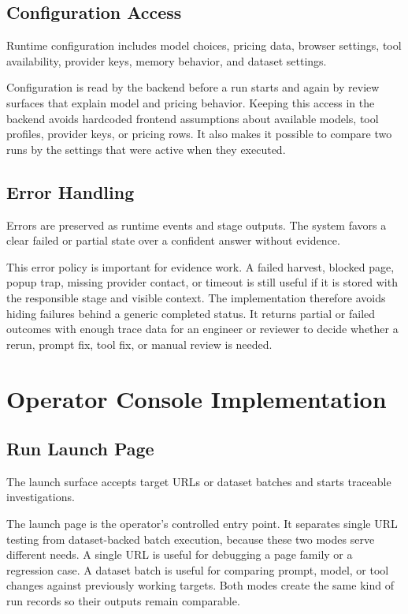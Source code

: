 \subsection{Configuration Access}

Runtime configuration includes model choices, pricing data, browser settings,
tool availability, provider keys, memory behavior, and dataset settings.

Configuration is read by the backend before a run starts and again by review
surfaces that explain model and pricing behavior. Keeping this access in the
backend avoids hardcoded frontend assumptions about available models, tool
profiles, provider keys, or pricing rows. It also makes it possible to compare
two runs by the settings that were active when they executed.

\subsection{Error Handling}

Errors are preserved as runtime events and stage outputs. The system favors a
clear failed or partial state over a confident answer without evidence.

This error policy is important for evidence work. A failed harvest, blocked
page, popup trap, missing provider contact, or timeout is still useful if it is
stored with the responsible stage and visible context. The implementation
therefore avoids hiding failures behind a generic completed status. It returns
partial or failed outcomes with enough trace data for an engineer or reviewer
to decide whether a rerun, prompt fix, tool fix, or manual review is needed.

\section{Operator Console Implementation}

\subsection{Run Launch Page}

The launch surface accepts target URLs or dataset batches and starts
traceable investigations.

The launch page is the operator's controlled entry point. It separates single
URL testing from dataset-backed batch execution, because these two modes serve
different needs. A single URL is useful for debugging a page family or a
regression case. A dataset batch is useful for comparing prompt, model, or tool
changes against previously working targets. Both modes create the same kind of
run records so their outputs remain comparable.


